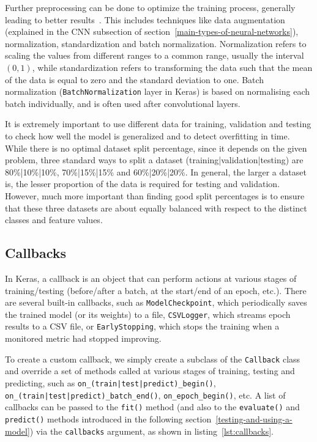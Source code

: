 Further preprocessing can be done to optimize the training process, generally leading to better results~\cite{isik2012importance}. 
This includes techniques like data augmentation (explained in the CNN subsection of section~\ref{main-types-of-neural-networks}),
normalization, standardization and batch normalization. Normalization refers to scaling the values from different ranges to
a common range, usually the interval $(0, 1)$, while standardization refers to transforming the data such that the mean
of the data is equal to zero and the standard deviation to one. Batch normalization (\texttt{BatchNormalization} layer
in Keras) is based on normalising each batch individually, and is often used after convolutional layers.

It is extremely important to use different data for training, validation and testing to check how well
the model is generalized and to detect overfitting in time.
While there is no optimal dataset split percentage, since it depends on the given problem,
three standard ways to split a dataset
(training|validation|testing) are 80\%|10\%|10\%, 70\%|15\%|15\% and 60\%|20\%|20\%. In general,
the larger a dataset is, the lesser proportion of the data is required for testing and validation.
However, much more important than finding good split percentages is to ensure that these three datasets are about
equally balanced with respect to the distinct classes and feature values.


\subsection*{Callbacks}
\label{callbacks}
In Keras, a callback is an object that can perform actions at various stages of training/testing
(before/after a batch,
at the start/end of an epoch, etc.). There are several built-in callbacks, such as \texttt{ModelCheckpoint},
which periodically saves the trained model (or its weights) to a file, \texttt{CSVLogger}, which streams
epoch results to a CSV file, or \texttt{EarlyStopping}, which stops the training when a monitored metric
had stopped improving.

To create a custom callback, we simply create a subclass of the \texttt{Callback} class and override a set of methods
called at various stages of training, testing and predicting, such as \texttt{on\_(train|test|predict)\_begin()},
\texttt{on\_(train|test|predict)\_batch\_end()}, \texttt{on\_epoch\_begin()}, etc.
A list of callbacks can be passed to the \texttt{fit()} method (and also to the \texttt{evaluate()} and \texttt{predict()}
methods introduced in the following section~\ref{testing-and-using-a-model}) via the \texttt{callbacks} argument,
as shown in listing~\ref{lst:callbacks}.

